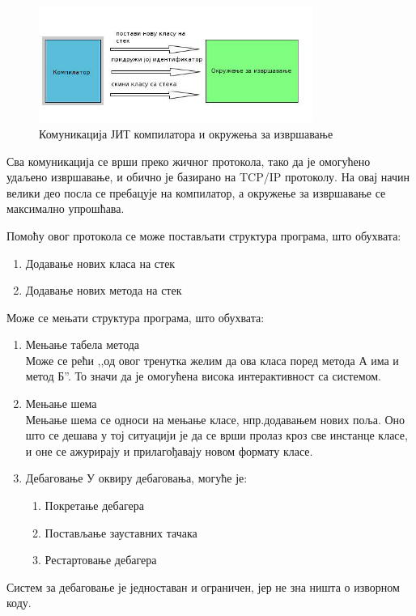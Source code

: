 \documentclass[12pt,oneside]{memoir}
\begin{document}
\begin{figure}[!ht]
  \centering
  \includegraphics[width=0.8\textwidth]{compiler.jpg}
  \caption{Комуникација ЈИТ компилатора и окружења за извршавање}
  \label{fig:komunikacija}
\end{figure}

Сва комуникација се врши преко жичног протокола, тако да је омогућено удаљено извршавање, и обично је базирано на TCP/IP протоколу. На овај начин велики део посла се пребацује на компилатор, а окружење за извршавање се максимално упрошћава.

Помоћу овог протокола се може постављати структура програма, што обухвата:
\begin{enumerate}
\item Додавање нових класа на стек
\item Додавање нових метода на стек
\end{enumerate}
Може се мењати структура програма, што обухвата:
\begin{enumerate}
\item Мењање табела метода\\
Може се рећи ,,од овог тренутка желим да ова класа поред метода А има и метод Б''. То значи да је омогућена висока интерактивност са системом.
\item Мењање шема\\
Мењање шема се односи на мењање класе, нпр.додавањем нових поља. Оно што се дешава у тој ситуацији је да се врши пролаз кроз све инстанце класе, и оне се ажурирају и прилагођавају новом формату класе.
\item Дебаговање
У оквиру дебаговања, могуће је:
\begin{enumerate}
\item Покретање дебагера
\item Постављање зауставних тачака
\item Рестартовање дебагера
\end{enumerate}
\end{enumerate}
Систем за дебаговање је једноставан и ограничен, јер не зна ништа о изворном коду.
\end{document}
